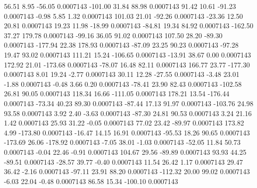        56.51        8.95      -56.05     0.0007143
     -101.00       31.84       88.98     0.0007143
       91.42       10.61      -91.23     0.0007143
       -0.98        5.85        1.32     0.0007143
      101.03       21.01      -92.26     0.0007143
      -23.36       12.50       20.81     0.0007143
       19.23       11.98      -18.99     0.0007143
      -84.81       19.34       84.92     0.0007143
     -162.50       37.27      179.78     0.0007143
      -99.16       36.05       91.02     0.0007143
      107.50       28.20      -89.30     0.0007143
     -177.94       22.38      178.93     0.0007143
      -87.09       23.25       90.23     0.0007143
      -97.28       19.47       93.02     0.0007143
      111.21       15.24     -106.65     0.0007143
      -13.91       38.67        0.00     0.0007143
      172.92       21.01     -173.68     0.0007143
      -78.07       16.48       82.11     0.0007143
      166.77       23.77     -177.30     0.0007143
        8.01       19.24       -2.77     0.0007143
       30.11       12.28      -27.55     0.0007143
       -3.48       23.01       -1.88     0.0007143
       -0.48        3.66        0.20     0.0007143
      -78.41       23.90       82.43     0.0007143
     -102.58       26.81       90.05     0.0007143
      118.34       16.66     -111.05     0.0007143
      178.21       13.54     -176.44     0.0007143
      -73.34       40.23       89.30     0.0007143
      -87.44       17.13       91.97     0.0007143
     -103.76       24.98       93.58     0.0007143
        3.92        2.40       -3.63     0.0007143
      -87.30       24.81       90.53     0.0007143
        3.24       21.16        1.42     0.0007143
       25.93       31.22       -0.05     0.0007143
       77.02       23.42      -89.97     0.0007143
      173.82        4.99     -173.80     0.0007143
      -16.47       14.15       16.91     0.0007143
      -95.53       18.26       90.65     0.0007143
     -173.69       26.06     -178.92     0.0007143
       -7.05       38.01       -1.03     0.0007143
      -52.05       11.84       50.73     0.0007143
       -0.04       22.46       -0.91     0.0007143
      104.67       29.56      -89.89     0.0007143
       93.93       44.25      -89.51     0.0007143
      -28.57       39.77       -0.40     0.0007143
       11.54       26.42        1.17     0.0007143
       29.47       36.42       -2.16     0.0007143
      -97.11       23.91       88.20     0.0007143
     -112.32       20.00       99.02     0.0007143
       -6.03       22.04       -0.48     0.0007143
       86.58       15.34     -100.10     0.0007143
